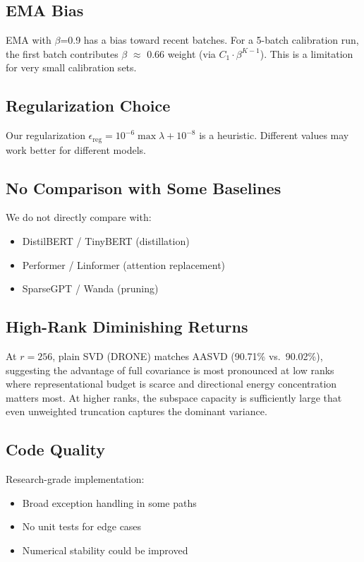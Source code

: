 \subsection{EMA Bias}

EMA with $\beta$=0.9 has a bias toward recent batches. For a 5-batch calibration 
run, the first batch contributes $\beta$  $\approx$ 0.66 weight (via $C_1 \cdot \beta^{K-1}$). 
This is a limitation for very small calibration sets.

\subsection{Regularization Choice}

Our regularization $\epsilon_\text{reg} = 10^{-6} \max \lambda + 10^{-8}$ is 
a heuristic. Different values may work better for different models.

\subsection{No Comparison with Some Baselines}

We do not directly compare with:
\begin{itemize}
\item DistilBERT / TinyBERT (distillation)
\item Performer / Linformer (attention replacement)
\item SparseGPT / Wanda (pruning)

\end{itemize}
\subsection{High-Rank Diminishing Returns}

At $r=256$, plain SVD (DRONE) matches AASVD (90.71\% vs.\ 90.02\%), suggesting the advantage of full covariance is most pronounced at low ranks where representational budget is scarce and directional energy concentration matters most. At higher ranks, the subspace capacity is sufficiently large that even unweighted truncation captures the dominant variance.

\subsection{Code Quality}

Research-grade implementation:
\begin{itemize}
\item Broad exception handling in some paths
\item No unit tests for edge cases
\item Numerical stability could be improved

\end{itemize}
